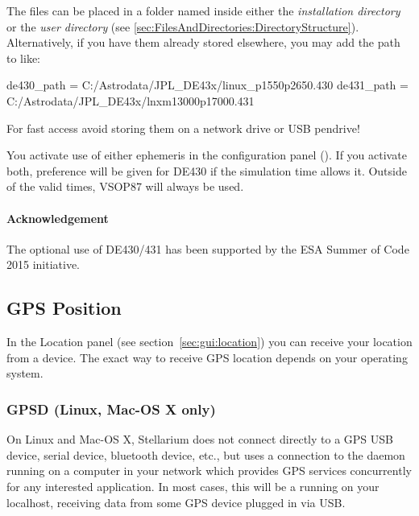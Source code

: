 The files can be placed in a folder named  inside either
the \emph{installation directory} or the \emph{user directory}
(see \ref{sec:FilesAndDirectories:DirectoryStructure}). Alternatively,
if you have them already stored elsewhere, you may add the path to
 like:

\begin{configfile}
[astro]
de430_path = C:/Astrodata/JPL_DE43x/linux_p1550p2650.430
de431_path = C:/Astrodata/JPL_DE43x/lnxm13000p17000.431
\end{configfile}

For fast access avoid storing them on a network drive or USB pendrive!

You activate use of either ephemeris in the configuration panel
(). If you activate both, preference will be given for DE430
if the simulation time allows it. Outside of the valid times, VSOP87
will always be used.

\paragraph{Acknowledgement}
The optional use of DE430/431 has been supported by the ESA Summer of
Code 2015 initiative.

\subsection{GPS Position}
\label{sec:ExtraData:GPS}

\noindent In the Location panel (see section~\ref{sec:gui:location}) you can receive your location from a  device. 
The exact way to receive GPS location depends on your operating system. 

\subsubsection{GPSD (Linux, Mac-OS X only)}
\label{sec:ExtraData:GPS:GPSD}

On Linux and Mac-OS X, Stellarium does not connect directly to a GPS USB device, serial device, 
bluetooth device, etc., but uses a connection to the  daemon running on a computer 
in your network which provides GPS services concurrently for any interested application. In most cases, 
this will be a  running on your localhost, receiving data from some GPS device 
plugged in via USB.

